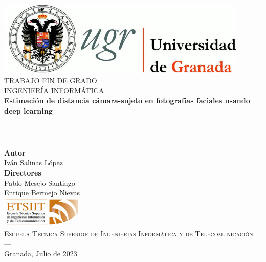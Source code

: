 \begin{titlepage}
 
 
\newlength{\centeroffset}
\setlength{\centeroffset}{-0.5\oddsidemargin}
\addtolength{\centeroffset}{0.5\evensidemargin}
\thispagestyle{empty}

\noindent\hspace*{\centeroffset}\begin{minipage}{\textwidth}

\centering
\includegraphics[width=0.9\textwidth]{imagenes/logo_ugr.jpg}\\[1.4cm]

\textsc{ \Large TRABAJO FIN DE GRADO\\[0.2cm]}
\textsc{ INGENIERÍA INFORMÁTICA}\\[1cm]
% 
{\huge\bfseries Estimación de distancia cámara-sujeto en fotografías faciales usando deep learning\\
}
\noindent\rule[-1ex]{\textwidth}{3pt}\\[3.5ex]
\end{minipage}

\vspace{2.5cm}
\noindent\hspace*{\centeroffset}\begin{minipage}{\textwidth}
\centering

\textbf{Autor}\\ {Iván Salinas López}\\[2.5ex]
\textbf{Directores}\\
{Pablo Mesejo Santiago\\
Enrique Bermejo Nievas}\\[2cm]
\includegraphics[width=0.3\textwidth]{imagenes/etsiit_logo.png}\\[0.1cm]
\textsc{Escuela Técnica Superior de Ingenierías Informática y de Telecomunicación}\\
\textsc{---}\\
Granada, Julio de 2023
\end{minipage}
\end{titlepage}


